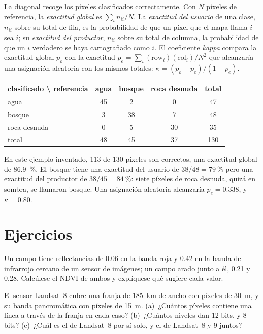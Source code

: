 La diagonal recoge los píxeles clasificados correctamente. Con $N$ píxeles de referencia,
la \emph{exactitud global} es $\sum_i n_{ii}/N$. La \emph{exactitud del usuario}
de una clase, $n_{ii}$ sobre su total de fila, es la probabilidad de que un
píxel que el mapa llama $i$ sea $i$; su \emph{exactitud del productor}, $n_{ii}$
sobre su total de columna, la probabilidad de que un $i$ verdadero se haya cartografiado como $i$. El
coeficiente \emph{kappa} compara la exactitud global $p_o$ con la
exactitud $p_e = \sum_i (\text{row}_i)(\text{col}_i)/N^2$ que alcanzaría una
asignación aleatoria con los mismos totales: $\kappa = (p_o - p_e)/(1 -
p_e)$.

\begin{center}
\small
\begin{tabular}{l|ccc|c}
\hline
clasificado \textbackslash{} referencia & agua & bosque & roca desnuda & total \\
\hline
agua & 45 & 2 & 0 & 47 \\
bosque & 3 & 38 & 7 & 48 \\
roca desnuda & 0 & 5 & 30 & 35 \\
\hline
total & 48 & 45 & 37 & 130 \\
\hline
\end{tabular}
\end{center}

En este ejemplo inventado, 113 de 130 píxeles son correctos, una exactitud global
de \qty{86.9}{\percent}. El bosque tiene una exactitud del usuario de
$38/48 = \qty{79}{\percent}$ pero una exactitud del productor de $38/45 =
\qty{84}{\percent}$: siete píxeles de roca desnuda, quizá en sombra, se
llamaron bosque. Una asignación aleatoria alcanzaría $p_e = 0.338$, y $\kappa =
0.80$.

\section{Ejercicios}

\begin{exercise}[$\star$]\label{exo:b3:remote-sensing-gis:1}
Un campo tiene reflectancias de 0.06 en la banda roja y 0.42 en la
banda del infrarrojo cercano de un sensor de imágenes; un campo arado junto a él, 0.21 y
0.28. Calcúlese el NDVI de ambos y explíquese qué sugiere cada valor.
\end{exercise}

\begin{exercise}[$\star$]\label{exo:b3:remote-sensing-gis:2}
El sensor Landsat~8 cubre una franja de \qty{185}{km} de ancho con píxeles de
\qty{30}{m}, y su banda pancromática con píxeles de \qty{15}{m}. (a)~¿Cuántos
píxeles contiene una línea a través de la franja en cada caso? (b)~¿Cuántos niveles
dan 12 bits, y 8 bits? (c)~¿Cuál es el  de Landsat~8
por sí solo, y el de Landsat~8 y 9 juntos?
\end{exercise}

